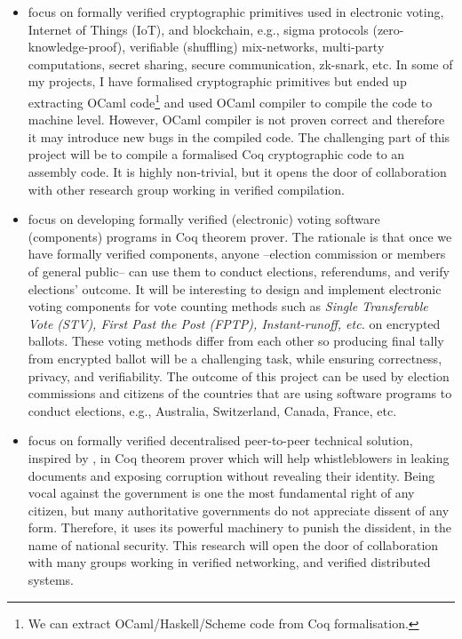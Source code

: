 \documentclass[a4paper]{article}
\begin{document}
\begin{itemize}



\item focus on formally verified cryptographic primitives used in electronic voting, 
  Internet of Things (IoT), and blockchain, e.g., 
	sigma protocols (zero-knowledge-proof), verifiable (shuffling) mix-networks, 
	multi-party computations, secret sharing, secure communication, zk-snark, etc. 
	In some of my projects, I have formalised
	cryptographic primitives but ended up extracting OCaml 
	code\footnote{We can extract OCaml/Haskell/Scheme 
	code from Coq formalisation.} and used OCaml compiler to 
	compile the code to machine level. However, OCaml compiler is not proven correct 
	and therefore it may introduce new bugs in the compiled code. The challenging part 
	of this project will be to compile a formalised Coq cryptographic 
	code to an assembly code. It is highly non-trivial, but it opens the door of 
	collaboration with other research group working in verified compilation.

\item focus on developing formally verified (electronic) voting 
software (components) programs in Coq theorem prover. 
The rationale is that once we have formally verified 
components, anyone --election commission or members of general public-- can use them 
to conduct elections, referendums, and verify elections' outcome.
It will be interesting to design and implement electronic voting components  
for vote counting methods such as \textit{Single Transferable Vote (STV), 
First Past the Post (FPTP), Instant-runoff, etc.} on encrypted ballots. These 
voting methods differ from each other so producing final tally from encrypted 
ballot will be a challenging task, while ensuring correctness, privacy, and 
verifiability. The outcome of this project can be used by election commissions and citizens of 
the countries that are using software programs to conduct elections, e.g.,
Australia, Switzerland, Canada, France, etc. 

\item focus on formally verified decentralised peer-to-peer technical solution, inspired by 
\cite{liu2004linkable, Clarke2001, schimmer2009peer}, in Coq theorem prover which will help 
whistleblowers in leaking documents and exposing corruption without revealing their identity. 
Being vocal against the government is one the most fundamental right of any citizen, but many 
authoritative governments do not appreciate dissent of any form. Therefore, it uses 
its powerful machinery to punish the dissident, in the name of national security.  
This research will open the door of collaboration with many groups working in verified 
networking, and verified distributed systems. 




\end{itemize}
\end{document}
